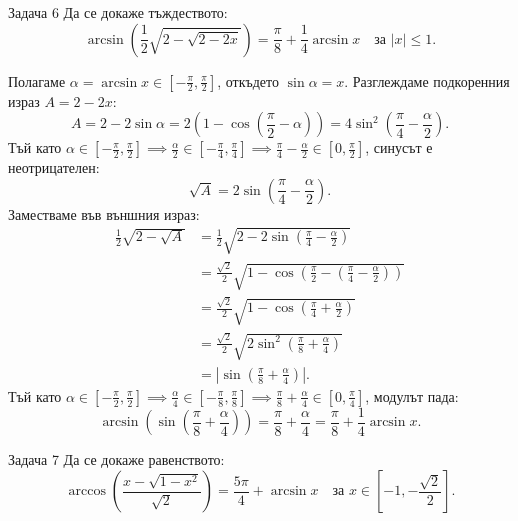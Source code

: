 \begin{problembox}{Задача 6}
Да се докаже тъждеството:
\[
\arcsin\left(\frac{1}{2}\sqrt{2 - \sqrt{2-2x}}\right) = \frac{\pi}{8} + \frac{1}{4}\arcsin x \quad \text{за } |x| \le 1.
\]
\end{problembox}

\begin{solution}
Полагаме $\alpha = \arcsin x \in \left[-\frac{\pi}{2}, \frac{\pi}{2}\right]$, откъдето $\sin\alpha = x$.
Разглеждаме подкоренния израз $A = 2 - 2x$:
\[
A = 2 - 2\sin\alpha = 2\left(1 - \cos\left(\frac{\pi}{2} - \alpha\right)\right) = 4\sin^2\left(\frac{\pi}{4} - \frac{\alpha}{2}\right).
\]
Тъй като $\alpha \in \left[-\frac{\pi}{2}, \frac{\pi}{2}\right] \implies \frac{\alpha}{2} \in \left[-\frac{\pi}{4}, \frac{\pi}{4}\right] \implies \frac{\pi}{4} - \frac{\alpha}{2} \in \left[0, \frac{\pi}{2}\right]$, синусът е неотрицателен:
\[
\sqrt{A} = 2\sin\left(\frac{\pi}{4} - \frac{\alpha}{2}\right).
\]
Заместваме във външния израз:
\begin{align*}
\frac{1}{2}\sqrt{2 - \sqrt{A}} &= \frac{1}{2}\sqrt{2 - 2\sin\left(\frac{\pi}{4} - \frac{\alpha}{2}\right)} \\
&= \frac{\sqrt{2}}{2}\sqrt{1 - \cos\left(\frac{\pi}{2} - \left(\frac{\pi}{4} - \frac{\alpha}{2}\right)\right)} \\
&= \frac{\sqrt{2}}{2}\sqrt{1 - \cos\left(\frac{\pi}{4} + \frac{\alpha}{2}\right)} \\
&= \frac{\sqrt{2}}{2}\sqrt{2\sin^2\left(\frac{\pi}{8} + \frac{\alpha}{4}\right)} \\
&= \left|\sin\left(\frac{\pi}{8} + \frac{\alpha}{4}\right)\right|.
\end{align*}
Тъй като $\alpha \in \left[-\frac{\pi}{2}, \frac{\pi}{2}\right] \implies \frac{\alpha}{4} \in \left[-\frac{\pi}{8}, \frac{\pi}{8}\right] \implies \frac{\pi}{8} + \frac{\alpha}{4} \in \left[0, \frac{\pi}{4}\right]$, модулът пада:
\[
\arcsin\left(\sin\left(\frac{\pi}{8} + \frac{\alpha}{4}\right)\right) = \frac{\pi}{8} + \frac{\alpha}{4} = \frac{\pi}{8} + \frac{1}{4}\arcsin x.
\]
\end{solution}

\begin{problembox}{Задача 7}
Да се докаже равенството:
\[
\arccos\left(\frac{x - \sqrt{1-x^2}}{\sqrt{2}}\right) = \frac{5\pi}{4} + \arcsin x \quad \text{за } x \in \left[-1, -\frac{\sqrt{2}}{2}\right].
\]
\end{problembox}

